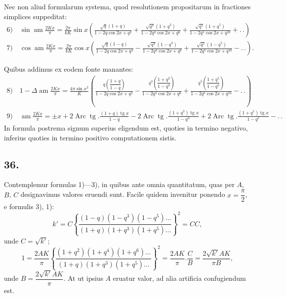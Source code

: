 \documentclass{article}
\begin{document}
Nec non aliud formularum systema, quod resolutionem propositarum in fractiones simplices suppeditat:
\[
\begin{gathered}
\text{6)}\quad\sin\operatorname{am}\frac{2Kx}{\pi}=\frac{2\pi}{kK}\sin x\left(\frac{\sqrt{q}(1+q)}{1-2q\cos 2x+q^{2}}+\frac{\sqrt{q^{3}}(1+q^{3})}{1-2q^{3}\cos 2x+q^{6}}+\frac{\sqrt{q^{5}}(1+q^{5})}{1-2q^{5}\cos 2x+q^{10}}+.\,.\right)
\\[2ex]
\text{7)}\quad\cos\operatorname{am}\frac{2Kx}{\pi}=\frac{2\pi}{kK}\cos x\left(\frac{\sqrt{q}(1-q)}{1-2q\cos 2x+q^{2}}-\frac{\sqrt{q^{3}}(1-q^{3})}{1-2q^{3}\cos 2x+q^{6}}+\frac{\sqrt{q^{5}}(1-q^{5})}{1-2q^{5}\cos 2x+q^{10}}-.\,.\right).
\end{gathered}
\]

Quibus addimus ex eodem fonte manantes:
\[
\begin{gathered}
\text{8)}\quad 1-\Delta\operatorname{am}\frac{2Kx}{\pi}=\frac{4\pi\sin x^{2}}{K}\left(\frac{q\left(\dfrac{1+q}{1-q}\right)}{1-2q\cos 2x+q^{2}}-\frac{q^{3}\left(\dfrac{1+q^{3}}{1-q^{3}}\right)}{1-2q^{3}\cos 2x+q^{6}}+\frac{q^{5}\left(\dfrac{1+q^{5}}{1-q^{5}}\right)}{1-2q^{5}\cos 2x+q^{10}}-.\,.\right)
\\[2ex]
\text{9)}\quad\operatorname{am}\frac{2Kx}{\pi}=\pm x+2\operatorname{Arc}\operatorname{tg}.\frac{(1+q)\operatorname{tg}x}{1-q}-2\operatorname{Arc}\operatorname{tg}.\frac{(1+q^{3})\operatorname{tg}x}{1-q^{3}}+2\operatorname{Arc}\operatorname{tg}.\frac{(1+q^{5})\operatorname{tg}x}{1-q^{5}}-.\,.
\end{gathered}
\]
In formula postrema signum superius eligendum est, quoties in termino negativo, inferius quoties in termino positivo computationem sistis.

\subsection*{36.}

Contemplemur formulas 1)---3), in quibus ante omnia quantitatum, quas per $A$, $B$, $C$ designavimus valores eruendi sunt. Facile quidem invenitur ponendo $x=\dfrac{\pi}{2}$, e formulis 3), 1):
\[
k'=C\left\{\frac{(1-q)(1-q^{3})(1-q^{5})\ldots}{(1+q)(1+q^{3})(1+q^{5})\ldots}\right\}^{2}=CC,
\]
unde $C=\sqrt{k'}$;
\[
1=\frac{2AK}{\pi}\left\{\frac{(1+q^{2})(1+q^{4})(1+q^{6})\ldots}{(1+q)(1+q^{3})(1+q^{5})\ldots}\right\}^{2}=\frac{2AK}{\pi}.\frac{C}{B}=\frac{2\sqrt{k'}AK}{\pi B},
\]
unde $B=\dfrac{2\sqrt{k'}AK}{\pi}$. At ut ipsius $A$ eruatur valor, ad alia artificia confugiendum est.
\end{document}
